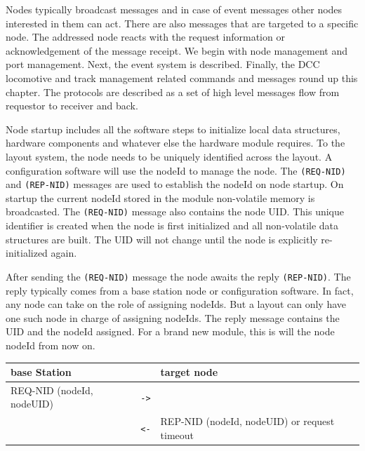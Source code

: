 
Nodes typically broadcast messages and in case of event messages other nodes interested in them can act. There are also messages that are targeted to a specific node. The addressed node reacts with the request information or acknowledgement of the message receipt. We begin with node management and port management. Next, the event system is described. Finally, the DCC locomotive and track management related commands and messages round up this chapter. The protocols are described as a set of high level messages flow from requestor to receiver and back.


Node startup includes all the software steps to initialize local data structures, hardware components and whatever else the hardware module requires. To the layout system, the node needs to be uniquely identified across the layout. A configuration software will use the nodeId to manage the node. The \texttt{(REQ-NID)} and \texttt{(REP-NID)} messages are used to establish the nodeId on node startup. On startup the current nodeId stored in the module non-volatile memory is broadcasted. The \texttt{(REQ-NID)} message also contains the node UID. This unique identifier is created when the node is first initialized and all non-volatile data structures are built. The UID will not change until the node is explicitly re-initialized again.

After sending the \texttt{(REQ-NID)} message the node awaits the reply \texttt{(REP-NID)}. The reply typically comes from a base station node or configuration software. In fact, any node can take on the role of assigning nodeIds. But a layout can only have one such node in charge of assigning nodeIds. The reply message contains the UID and the nodeId assigned. For a brand new module, this is will the node nodeId from now on.

\begin{table}[ht!]
    \begin{center}
        \begin{tabular}{|p{}| c | p{}|}
            \toprule
            \textbf{base Station} & & \textbf{target node} \\
            \midrule
            REQ-NID (nodeId, nodeUID)  & \texttt{->} & \\
            & \texttt{<-} & REP-NID (nodeId, nodeUID) or request timeout \\
            \bottomrule
        \end{tabular}
    \end{center}
\end{table}

